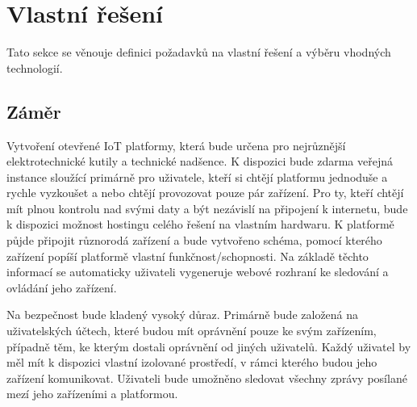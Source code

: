 \section{Vlastní řešení}
Tato sekce se věnouje definici požadavků na vlastní řešení a výběru vhodných technologií.

\subsection{Záměr}
Vytvoření otevřené IoT platformy, která bude určena pro nejrůznější elektrotechnické kutily a technické nadšence. K dispozici bude zdarma veřejná instance sloužící primárně pro uživatele, kteří si chtějí platformu jednoduše a rychle vyzkoušet a nebo chtějí provozovat pouze pár zařízení. Pro ty, kteří chtějí mít plnou kontrolu nad svými daty a být nezávislí na připojení k internetu, bude k dispozici možnost hostingu celého řešení na vlastním hardwaru. K platformě půjde připojit různorodá zařízení a bude vytvořeno schéma, pomocí kterého zařízení popíší platformě vlastní funkčnost/schopnosti. Na základě těchto informací se automaticky uživateli vygeneruje webové rozhraní ke sledování a ovládání jeho zařízení.

Na bezpečnost bude kladený vysoký důraz. Primárně bude založená na uživatelských účtech, které budou mít oprávnění pouze ke svým zařízením, případně těm, ke kterým dostali oprávnění od jiných uživatelů. Každý uživatel by měl mít k dispozici vlastní izolované prostředí, v rámci kterého budou jeho zařízení komunikovat. Uživateli bude umožněno sledovat všechny zprávy posílané mezí jeho zařízeními a platformou.


